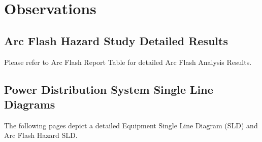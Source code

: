 \section{Observations}
\label{af:observations}

\subsection{Arc Flash Hazard Study Detailed Results}
\label{af:observations:at}

Please refer to Arc Flash Report Table for detailed Arc Flash Analysis Results.

%

\pagebreak

\subsection{Power Distribution System Single Line Diagrams}
\label{af:observations:sld}

The following pages depict a detailed Equipment Single Line Diagram (SLD) and Arc Flash Hazard SLD.